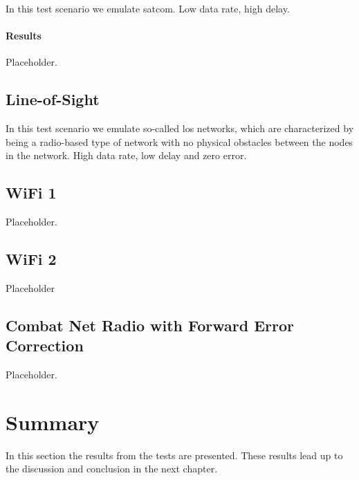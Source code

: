 In this test scenario we emulate \gls{satcom}. Low data rate, high delay.

\paragraph{Results}
Placeholder.

\subsection{Line-of-Sight}

In this test scenario we emulate so-called \gls{los} networks, which are
characterized by being a radio-based type of network with no physical obstacles
between the nodes in the network. High data rate, low delay and zero error.

\subsection{WiFi 1}

Placeholder.


\subsection{WiFi 2}

Placeholder

\subsection{Combat Net Radio with Forward Error Correction}

Placeholder.

\section{Summary}

In this section the results from the tests are presented. These results lead up
to the discussion and conclusion in the next chapter.
